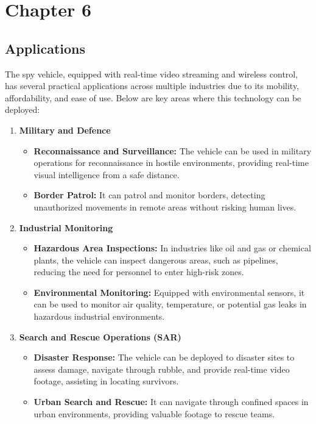 \documentclass[12pt,a4paper]{report}
\begin{document}
	{\vfill \chapter*{\centering \vfill Chapter 6 \vfill}\vfill}
	\thispagestyle{empty}
	\newpage
	\label{Applications}
\section{Applications}

The spy vehicle, equipped with real-time video streaming and wireless control, has several practical applications across multiple industries due to its mobility, affordability, and ease of use. Below are key areas where this technology can be deployed:

\begin{enumerate}
    \item \textbf{Military and Defence}
    \begin{itemize}
        \item \textbf{Reconnaissance and Surveillance:} The vehicle can be used in military operations for reconnaissance in hostile environments, providing real-time visual intelligence from a safe distance.
        \item \textbf{Border Patrol:} It can patrol and monitor borders, detecting unauthorized movements in remote areas without risking human lives.
    \end{itemize}
    
    \item \textbf{Industrial Monitoring}
    \begin{itemize}
        \item \textbf{Hazardous Area Inspections:} In industries like oil and gas or chemical plants, the vehicle can inspect dangerous areas, such as pipelines, reducing the need for personnel to enter high-risk zones.
        \item \textbf{Environmental Monitoring:} Equipped with environmental sensors, it can be used to monitor air quality, temperature, or potential gas leaks in hazardous industrial environments.
    \end{itemize}
        
    \item \textbf{Search and Rescue Operations (SAR)}
    \begin{itemize}
        \item \textbf{Disaster Response:} The vehicle can be deployed to disaster sites to assess damage, navigate through rubble, and provide real-time video footage, assisting in locating survivors.
        \item \textbf{Urban Search and Rescue:} It can navigate through confined spaces in urban environments, providing valuable footage to rescue teams.
    \end{itemize}
    

\end{enumerate}
\end{document}
